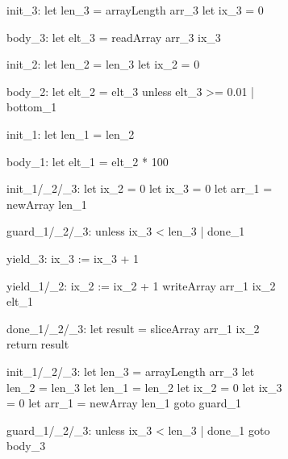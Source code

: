 \documentclass[preamble.tex]{subfiles}
\begin{document}
\providecommand\CommentsColor{\color{MidnightBlue}}
\providecommand\WhatCombinator[1]{\enrule[\CommentsColor]{0.95\textwidth}{#1}}



\begin{figure}
\vspace*{-1cm}
\hspace*{-0.5cm}
\begin{subfigure}{.55\textwidth}
\begin{loopcode}[%
    literate=
        {_1}{{\sub{map}}}3  %
        {_2}{{\sub{filt}}}2 %
        {_3}{{\sub{mfst}}}3 %
]
init_3:
  let len_3 = arrayLength arr_3
  let ix_3 = 0

body_3:
  let elt_3 = readArray arr_3 ix_3


init_2:
  let len_2 = len_3
  let ix_2 = 0

body_2:
  let elt_2 = elt_3
  unless elt_3 >= 0.01 | bottom_1


init_1:
  let len_1 = len_2

body_1:
  let elt_1 = elt_2 * 100


init_1/_2/_3:
  let ix_2 = 0
  let ix_3 = 0
  let arr_1 = newArray len_1

guard_1/_2/_3:
  unless ix_3 < len_3 | done_1

yield_3:
  ix_3 := ix_3 + 1

yield_1/_2:
  ix_2 := ix_2 + 1
  writeArray arr_1 ix_2 elt_1

done_1/_2/_3:
  let result = sliceArray arr_1 ix_2
  return result
\end{loopcode}
\end{subfigure}%
\begin{subfigure}{.45\textwidth}
\begin{loopcode}[%
    literate=
        {_1}{{\sub{map}}}3  %
        {_2}{{\sub{filt}}}2 %
        {_3}{{\sub{mfst}}}3 %
]
init_1/_2/_3:
  let len_3 = arrayLength arr_3
  let len_2 = len_3
  let len_1 = len_2
  let ix_2 = 0
  let ix_3 = 0
  let arr_1 = newArray len_1
  goto guard_1

guard_1/_2/_3:
  unless ix_3 < len_3 | done_1
  goto body_3


\end{loopcode}
\end{subfigure}
\end{figure}
\end{document}
